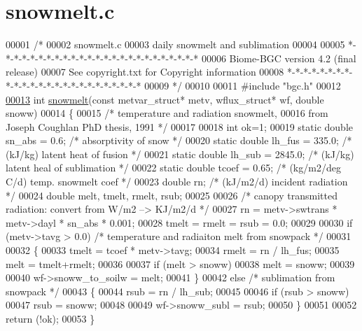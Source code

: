 \hypertarget{snowmelt_8c_source}{}\section{snowmelt.\+c}
\label{snowmelt_8c_source}

\begin{DoxyCode}
00001 \textcolor{comment}{/* }
00002 \textcolor{comment}{snowmelt.c}
00003 \textcolor{comment}{daily snowmelt and sublimation}
00004 \textcolor{comment}{}
00005 \textcolor{comment}{*-*-*-*-*-*-*-*-*-*-*-*-*-*-*-*-*-*-*-*-*-*-*-*-*}
00006 \textcolor{comment}{Biome-BGC version 4.2 (final release)}
00007 \textcolor{comment}{See copyright.txt for Copyright information}
00008 \textcolor{comment}{*-*-*-*-*-*-*-*-*-*-*-*-*-*-*-*-*-*-*-*-*-*-*-*-*}
00009 \textcolor{comment}{*/}
00010 
00011 \textcolor{preprocessor}{#include "bgc.h"}
00012 
\hypertarget{snowmelt_8c_source_l00013}{}\hyperlink{snowmelt_8c_a15e5894893f03411741f82c914d50516}{00013} \textcolor{keywordtype}{int} \hyperlink{snowmelt_8c_a15e5894893f03411741f82c914d50516}{snowmelt}(\textcolor{keyword}{const} metvar\_struct* metv, wflux\_struct* wf, \textcolor{keywordtype}{double} snoww)
00014 \{
00015     \textcolor{comment}{/* temperature and radiation snowmelt, }
00016 \textcolor{comment}{    from Joseph Coughlan PhD thesis, 1991 */}
00017 
00018     \textcolor{keywordtype}{int} ok=1;
00019     \textcolor{keyword}{static} \textcolor{keywordtype}{double} sn\_abs = 0.6;    \textcolor{comment}{/* absorptivity of snow */}
00020     \textcolor{keyword}{static} \textcolor{keywordtype}{double} lh\_fus = 335.0;  \textcolor{comment}{/* (kJ/kg) latent heat of fusion */}
00021     \textcolor{keyword}{static} \textcolor{keywordtype}{double} lh\_sub = 2845.0; \textcolor{comment}{/* (kJ/kg) latent heal of sublimation */}
00022     \textcolor{keyword}{static} \textcolor{keywordtype}{double} tcoef  = 0.65;   \textcolor{comment}{/* (kg/m2/deg C/d) temp. snowmelt coef */}
00023     \textcolor{keywordtype}{double} rn;                     \textcolor{comment}{/* (kJ/m2/d) incident radiation */}
00024     \textcolor{keywordtype}{double} melt, tmelt, rmelt, rsub;
00025 
00026     \textcolor{comment}{/* canopy transmitted radiation: convert from W/m2 --> KJ/m2/d */}   
00027     rn = metv->swtrans * metv->dayl * sn\_abs * 0.001;
00028     tmelt = rmelt = rsub = 0.0;
00029     
00030     \textcolor{keywordflow}{if} (metv->tavg > 0.0)  \textcolor{comment}{/* temperature and radiaiton melt from snowpack */}
00031 
00032     \{
00033         tmelt = tcoef * metv->tavg;
00034         rmelt = rn / lh\_fus;
00035         melt = tmelt+rmelt;
00036     
00037         \textcolor{keywordflow}{if} (melt > snoww)
00038             melt = snoww;
00039     
00040         wf->snoww\_to\_soilw = melt;
00041     \}
00042     \textcolor{keywordflow}{else}  \textcolor{comment}{/* sublimation from snowpack */}
00043     \{
00044         rsub = rn / lh\_sub;
00045     
00046         \textcolor{keywordflow}{if} (rsub > snoww)
00047             rsub = snoww;
00048     
00049         wf->snoww\_subl = rsub;
00050     \}   
00051     
00052     \textcolor{keywordflow}{return} (!ok);
00053 \}
\end{DoxyCode}
